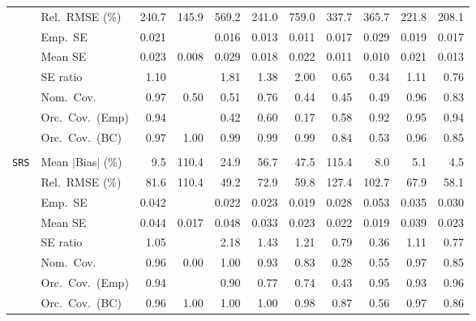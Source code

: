 \begin{landscape}
\begin{longtable}{llrrrrrrrrr}
 & Rel.\ RMSE (\%) & 240.7 & \cellcolor{rankone}145.9 & 569.2 & 241.0 & 759.0 & 337.7 & 365.7 & \cellcolor{rankthree}221.8 & \cellcolor{ranktwo}208.1 \\
 & Emp.\ SE & 0.021 &  & 0.016 & 0.013 & 0.011 & 0.017 & 0.029 & 0.019 & 0.017 \\
 & Mean SE & 0.023 & 0.008 & 0.029 & 0.018 & 0.022 & 0.011 & 0.010 & 0.021 & 0.013 \\
 & SE ratio & \cellcolor{rankone}1.10 &  & 1.81 & 1.38 & 2.00 & 0.65 & 0.34 & \cellcolor{ranktwo}1.11 & \cellcolor{rankthree}0.76 \\
 & Nom.\ Cov. & \cellcolor{ranktwo}0.97 & 0.50 & 0.51 & 0.76 & 0.44 & 0.45 & 0.49 & \cellcolor{rankone}0.96 & \cellcolor{rankthree}0.83 \\
 & Orc.\ Cov.\ (Emp) & \cellcolor{ranktwo}0.94 &  & 0.42 & 0.60 & 0.17 & 0.58 & \cellcolor{rankthree}0.92 & \cellcolor{rankone}0.95 & \cellcolor{ranktwo}0.94 \\
 & Orc.\ Cov.\ (BC) & \cellcolor{ranktwo}0.97 & 1.00 & \cellcolor{rankthree}0.99 & \cellcolor{rankthree}0.99 & \cellcolor{rankthree}0.99 & 0.84 & 0.53 & \cellcolor{rankone}0.96 & 0.85 \\
\addlinespace[2pt]
\multicolumn{11}{l}{\textbf{Continuous Phase-One Covariates}} \\
\addlinespace[2pt]
\quad \texttt{SRS} & Mean $|$Bias$|$ (\%) & 9.5 & 110.4 & 24.9 & 56.7 & 47.5 & 115.4 & \cellcolor{rankthree}8.0 & \cellcolor{ranktwo}5.1 & \cellcolor{rankone}4.5 \\
 & Rel.\ RMSE (\%) & 81.6 & 110.4 & \cellcolor{rankone}49.2 & 72.9 & \cellcolor{rankthree}59.8 & 127.4 & 102.7 & 67.9 & \cellcolor{ranktwo}58.1 \\
 & Emp.\ SE & 0.042 &  & 0.022 & 0.023 & 0.019 & 0.028 & 0.053 & 0.035 & 0.030 \\
 & Mean SE & 0.044 & 0.017 & 0.048 & 0.033 & 0.023 & 0.022 & 0.019 & 0.039 & 0.023 \\
 & SE ratio & \cellcolor{rankone}1.05 &  & 2.18 & 1.43 & \cellcolor{rankthree}1.21 & \cellcolor{rankthree}0.79 & 0.36 & \cellcolor{ranktwo}1.11 & 0.77 \\
 & Nom.\ Cov. & \cellcolor{rankone}0.96 & 0.00 & \cellcolor{rankthree}1.00 & \cellcolor{ranktwo}0.93 & 0.83 & 0.28 & 0.55 & \cellcolor{ranktwo}0.97 & 0.85 \\
 & Orc.\ Cov.\ (Emp) & \cellcolor{ranktwo}0.94 &  & 0.90 & 0.77 & 0.74 & 0.43 & \cellcolor{rankone}0.95 & \cellcolor{rankthree}0.93 & \cellcolor{ranktwo}0.96 \\
 & Orc.\ Cov.\ (BC) & \cellcolor{rankone}0.96 & 1.00 & 1.00 & 1.00 & \cellcolor{rankthree}0.98 & 0.87 & 0.56 & \cellcolor{ranktwo}0.97 & 0.86 \\

\end{longtable}
\end{landscape}
